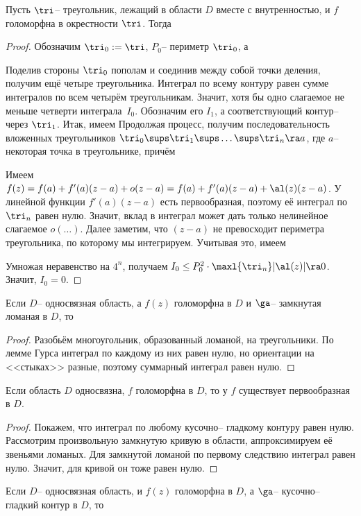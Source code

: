 \documentclass[a4paper]{article}
\begin{document}
\begin{lemma}[E.\,Goursat]
Пусть $\tri$-- треугольник, лежащий в области $D$ вместе с внутренностью, и $f$ голоморфна в
окрестности $\tri$. Тогда
\end{lemma}
\begin{proof}
Обозначим $\tri_0 := \tri$, $P_0$-- периметр $\tri_0$, а

Поделив стороны $\tri_{0}$ пополам и соединив между собой точки деления, получим ещё четыре треугольника.
Интеграл по всему контуру равен сумме интегралов по всем четырём треугольникам. Значит, хотя бы одно слагаемое не меньше
четверти интеграла~$I_0$. Обозначим его $I_1$, а соответствующий контур-- через $\tri_1$. Итак, имеем
Продолжая процесс, получим последовательность вложенных треугольников
$\tri_0 \sups \tri_1 \sups \ldots \sups \tri_n \ra a$, где $a$-- некоторая точка в треугольнике, причём

Имеем $f(z)=f(a)+f'(a)(z-a)+o(z-a)  = f(a) + f'(a)(z-a) + \al(z)(z-a)$.
У линейной функции $f'(a)(z-a)$ есть первообразная, поэтому её интеграл по $\tri_n$ равен нулю. Значит, вклад
в интеграл может дать только нелинейное слагаемое $o(\dots)$. Далее заметим, что $(z-a)$ не превосходит периметра
треугольника, по которому мы интегрируем. Учитывая это, имеем


Умножая неравенство на $4^n$, получаем $I_0 \le P_0^2\cdot\maxl{\tri_n}|\al(z)| \ra 0$. Значит, $I_0 = 0$.
\end{proof}
\begin{imp}
Если $D$-- односвязная область, а $f(z)$ голоморфна в $D$ и $\ga$-- замкнутая ломаная в $D$, то
\end{imp}
\begin{proof}
Разобьём многоугольник, образованный ломаной, на треугольники. По лемме Гурса интеграл по каждому из них равен нулю,
но ориентации на <<стыках>> разные, поэтому суммарный интеграл равен нулю.
\end{proof}
\begin{imp}
Если область $D$ односвязна, $f$ голоморфна в $D$, то у $f$ существует первообразная в $D$.
\end{imp}
\begin{proof}
Покажем, что интеграл по любому кусочно-- гладкому контуру равен нулю. Рассмотрим произвольную замкнутую
кривую в области, аппроксимируем её звеньями ломаных. Для замкнутой ломаной по первому следствию интеграл равен
нулю. Значит, для кривой он тоже равен нулю.
\end{proof}
\begin{imp}
Если $D$-- односвязная область, и $f(z)$ голоморфна в $D$, а $\ga$-- кусочно-- гладкий контур в $D$, то
\end{imp}
\end{document}
